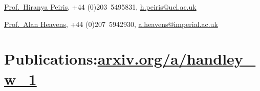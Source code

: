 \documentclass[11pt,a4paper,sans]{moderncv}
\begin{document}
\href{https://www.ucl.ac.uk/cosmoparticle/hiranya-peiris}{Prof.\ Hiranya Peiris}, {+44 (0)203~5495831}, \href{mailto:h.peiris@ucl.ac.uk}{h.peiris@ucl.ac.uk} 


\href{https://www.imperial.ac.uk/people/a.heavens}{Prof.\ Alan Heavens}, {+44 (0)207~5942930}, \href{mailto:a.heavens@imperial.ac.uk}{a.heavens@imperial.ac.uk} 

\section{Publications:\hfill  \href{https://arxiv.org/a/handley_w_1.html}{arxiv.org/a/handley\_w\_1}}


{\small
{}
}
\end{document}
